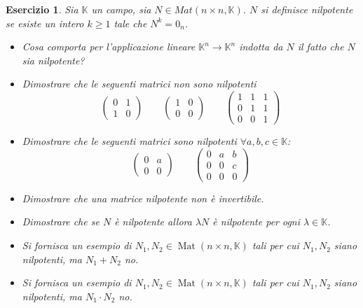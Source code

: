 \documentclass{article}
\newtheorem{es}{Esercizio}
\begin{document}
{\begin{es}
    Sia  $\mathbb{K}$ un campo, sia $N\in Mat(n \times n, \mathbb{K})$. $N$ si definisce nilpotente se esiste un intero $k\geq 1$ tale che $N^k=0_n$.
    \begin{itemize}
        \item Cosa comporta per l'applicazione lineare $\mathbb{K}^n\to \mathbb{K}^n$ indotta da $N$ il fatto che $N$ sia nilpotente?
        \item Dimostrare che le seguenti matrici non sono nilpotenti
            $$\begin{pmatrix}
              0 & 1 \\
              1 & 0
          \end{pmatrix}  
          \qquad \begin{pmatrix}
              1 & 0 \\
              0 & 0
          \end{pmatrix}\qquad 
          \begin{pmatrix}
              1 & 1 & 1 \\
              0 & 1 & 1 \\
              0 & 0 & 1
          \end{pmatrix}$$
        \item Dimostrare che le seguenti matrici sono nilpotenti $\forall a,b,c\in \mathbb{K}$:
        $$\begin{pmatrix}
              0 & a \\
              0 & 0
          \end{pmatrix}  
          \qquad 
          \begin{pmatrix}
              0 & a & b \\
              0 & 0 & c \\
              0 & 0 & 0
          \end{pmatrix}$$
        \item Dimostrare che una matrice nilpotente non è invertibile.
        \item Dimostrare che se $N$ è nilpotente allora $\lambda N$ è nilpotente per ogni $\lambda\in\mathbb{K}$.
        \item Si fornisca un esempio di $N_1, N_2\in \operatorname{Mat}(n\times n,\mathbb{K})$ tali per cui $N_1,N_2$ siano nilpotenti, ma $N_1+N_2$ no.
        \item Si fornisca un esempio di $N_1, N_2\in \operatorname{Mat}(n\times n,\mathbb{K})$ tali per cui $N_1,N_2$ siano nilpotenti, ma $N_1\cdot N_2$ no.
        

\end{itemize}
\end{es}}
\end{document}
